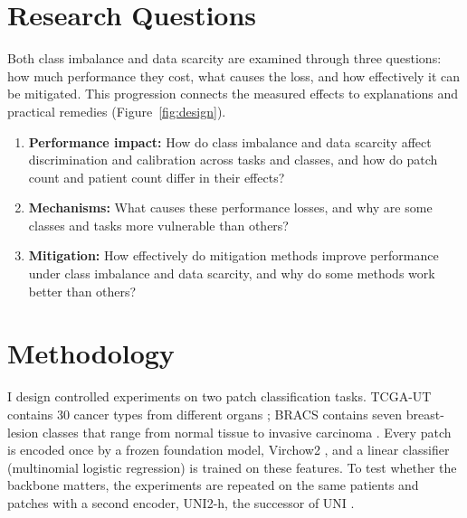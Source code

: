\documentclass[11pt,a4paper]{article}
\begin{document}
\section{Research Questions}
Both class imbalance and data scarcity are examined through three questions: how much performance they cost, what causes the loss, and how effectively it can be mitigated.
This progression connects the measured effects to explanations and practical remedies (Figure~\ref{fig:design}).
\begin{enumerate}
  \item \textbf{Performance impact:} How do class imbalance and data scarcity affect discrimination and calibration across tasks and classes, and how do patch count and patient count differ in their effects?
  \item \textbf{Mechanisms:} What causes these performance losses, and why are some classes and tasks more vulnerable than others?
  \item \textbf{Mitigation:} How effectively do mitigation methods improve performance under class imbalance and data scarcity, and why do some methods work better than others?
\end{enumerate}

\section{Methodology}
I design controlled experiments on two patch classification tasks.
TCGA-UT contains 30 cancer types from different organs \citep{komura2022universalEncoding}; BRACS contains seven breast-lesion classes that range from normal tissue to invasive carcinoma \citep{brancati2022bracs}.
Every patch is encoded once by a frozen foundation model, Virchow2 \citep{zimmermann2024virchow2}, and a linear classifier (multinomial logistic regression) is trained on these features.
To test whether the backbone matters, the experiments are repeated on the same patients and patches with a second encoder, UNI2-h, the successor of UNI \citep{chen2024uni}.
\end{document}

